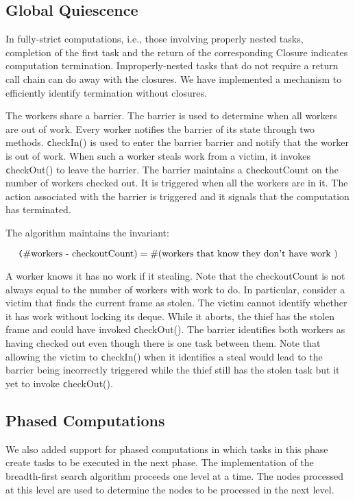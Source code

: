 \subsection{Global Quiescence}

In fully-strict computations, i.e., those involving properly nested
tasks, completion of the first task and the return of the
corresponding Closure indicates computation termination.
Improperly-nested tasks that do not require a return call chain can do
away with the closures. We have implemented a mechanism to efficiently
identify termination without closures.

The workers share a barrier. The barrier is used to determine when all
workers are out of work. Every worker notifies the barrier of its
state through two methods. {\texttt checkIn()} is used to enter the
barrier barrier and notify that the worker is out of work. When such a
worker steals work from a victim, it invokes {\texttt checkOut()} to
leave the barrier. The barrier maintains a {\texttt checkoutCount} on
the number of workers checked out. It is triggered when all the workers
are in it. The action associated with the barrier is triggered and it
signals that the computation has terminated.

The algorithm maintains the invariant:

\[
\mbox{{\texttt (\#workers - checkoutCount)}} = \mbox{\#(workers that know they don't
  have work )}
\]

A worker knows it has no work if it stealing. Note that the
checkoutCount is not always equal to the number of workers with work
to do. In particular, consider a victim that finds the current frame
as stolen. The victim cannot identify whether it has work without
locking its deque. While it aborts, the thief has the stolen
frame and could have invoked {\texttt checkOut()}. The barrier
identifies both workers as having checked out even though there is one
task between them. Note that allowing the victim to {\texttt
  checkIn()} when it identifies a steal would lead to the barrier
being incorrectly triggered while the thief still has the stolen task
but it yet to invoke {\texttt checkOut()}.


\subsection{Phased Computations}

We also added support for phased computations in which tasks in this
phase create tasks to be executed in the next phase. The
implementation of the breadth-first search algorithm proceeds one
level at a time. The nodes processed at this level are used to
determine the nodes to be processed in the next level.

